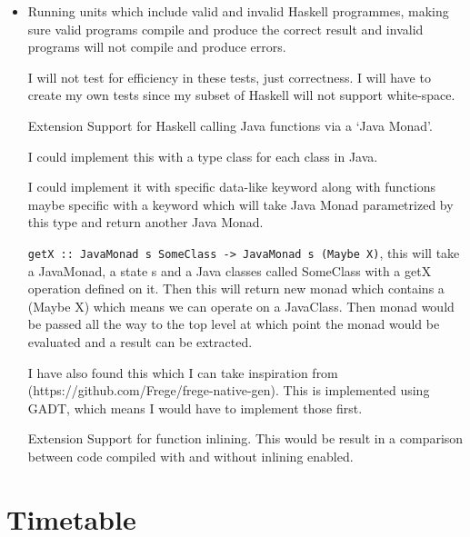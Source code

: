 \documentclass[a4paper,12pt]{article}
\begin{document}
  \begin{itemize}
    \item
      Running units which include valid and invalid Haskell programmes, making sure valid programs compile and produce the correct result and invalid
      programs will not compile and produce errors.

      I will not test for efficiency in these tests, just correctness. I will have to create my own tests since my subset of Haskell will not support white-space.

    \item
      [Extension] Support for Haskell calling Java functions via a `Java Monad'.
      
      I could implement this with a type class for each class in Java.
      
      I could implement it with specific data-like keyword along with functions
      maybe specific with a keyword which will take Java Monad parametrized by this type and return another Java Monad.

      \texttt{getX :: JavaMonad s SomeClass -> JavaMonad s (Maybe X)}, this will take a JavaMonad, a state s and a Java classes called SomeClass with a
      getX operation defined on it. Then this will return new monad which contains a (Maybe X) which means we can operate on a JavaClass. Then monad
      would be passed all the way to the top level at which point the monad would be evaluated and a result can be extracted.

      I have also found this which I can take inspiration from (https://github.com/Frege/frege-native-gen). This is implemented using GADT, which means
      I would have to implement those first.

    \item [Extension] Support for function inlining. This would be result in a comparison between code compiled with and without inlining enabled.
      

  \end{itemize}

  \section*{Timetable}

  \subsection{}
\end{document}
